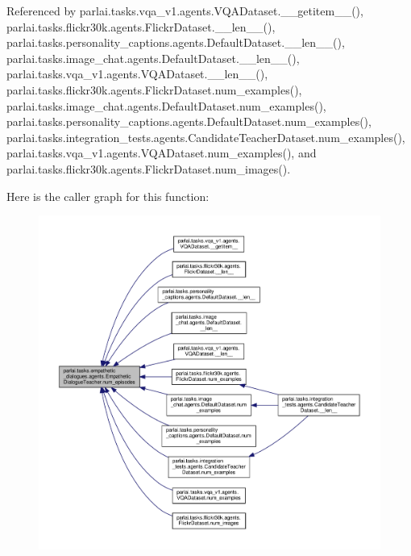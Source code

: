 Referenced by parlai.\+tasks.\+vqa\+\_\+v1.\+agents.\+V\+Q\+A\+Dataset.\+\_\+\+\_\+getitem\+\_\+\+\_\+(), parlai.\+tasks.\+flickr30k.\+agents.\+Flickr\+Dataset.\+\_\+\+\_\+len\+\_\+\+\_\+(), parlai.\+tasks.\+personality\+\_\+captions.\+agents.\+Default\+Dataset.\+\_\+\+\_\+len\+\_\+\+\_\+(), parlai.\+tasks.\+image\+\_\+chat.\+agents.\+Default\+Dataset.\+\_\+\+\_\+len\+\_\+\+\_\+(), parlai.\+tasks.\+vqa\+\_\+v1.\+agents.\+V\+Q\+A\+Dataset.\+\_\+\+\_\+len\+\_\+\+\_\+(), parlai.\+tasks.\+flickr30k.\+agents.\+Flickr\+Dataset.\+num\+\_\+examples(), parlai.\+tasks.\+image\+\_\+chat.\+agents.\+Default\+Dataset.\+num\+\_\+examples(), parlai.\+tasks.\+personality\+\_\+captions.\+agents.\+Default\+Dataset.\+num\+\_\+examples(), parlai.\+tasks.\+integration\+\_\+tests.\+agents.\+Candidate\+Teacher\+Dataset.\+num\+\_\+examples(), parlai.\+tasks.\+vqa\+\_\+v1.\+agents.\+V\+Q\+A\+Dataset.\+num\+\_\+examples(), and parlai.\+tasks.\+flickr30k.\+agents.\+Flickr\+Dataset.\+num\+\_\+images().

Here is the caller graph for this function\+:
\nopagebreak
\begin{figure}[H]
\begin{center}
\leavevmode
\includegraphics[width=350pt]{classparlai_1_1tasks_1_1empathetic__dialogues_1_1agents_1_1EmpatheticDialogueTeacher_a6859c7bc8c2c58f1c2ac23d7eb804eb7_icgraph}
\end{center}
\end{figure}
\mbox{\label{classparlai_1_1tasks_1_1empathetic__dialogues_1_1agents_1_1EmpatheticDialogueTeacher_ab6f8d6b5343bd3e535c02d64c194414e}} 
